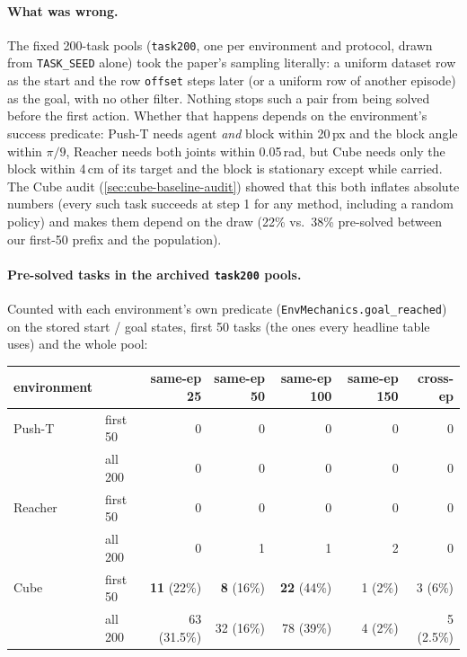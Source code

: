 \documentclass[11pt]{article}
\begin{document}
\paragraph{What was wrong.} The fixed 200-task pools (\texttt{task200}, one per environment
and protocol, drawn from \texttt{TASK\_SEED} alone) took the paper's sampling literally: a
uniform dataset row as the start and the row \texttt{offset} steps later (or a uniform row of
another episode) as the goal, with no other filter. Nothing stops such a pair from being
solved before the first action. Whether that happens depends on the environment's success
predicate: Push-T needs agent \emph{and} block within 20\,px and the block angle within
$\pi/9$, Reacher needs both joints within 0.05\,rad, but Cube needs only the block within 4\,cm
of its target and the block is stationary except while carried. The Cube audit
(\cref{sec:cube-baseline-audit}) showed that this both inflates absolute numbers (every such
task succeeds at step 1 for any method, including a random policy) and makes them depend on
the draw (22\% vs.\ 38\% pre-solved between our first-50 prefix and the population).

\paragraph{Pre-solved tasks in the archived \texttt{task200} pools.} Counted with each
environment's own predicate (\texttt{EnvMechanics.goal\_reached}) on the stored start / goal
states, first 50 tasks (the ones every headline table uses) and the whole pool:

\begin{center}\small
\begin{tabular}{llrrrrr}
\toprule
environment & & same-ep 25 & same-ep 50 & same-ep 100 & same-ep 150 & cross-ep \\
\midrule
Push-T  & first 50 & 0 & 0 & 0 & 0 & 0 \\
        & all 200  & 0 & 0 & 0 & 0 & 0 \\
Reacher & first 50 & 0 & 0 & 0 & 0 & 0 \\
        & all 200  & 0 & 1 & 1 & 2 & 0 \\
Cube    & first 50 & \textbf{11} (22\%) & \textbf{8} (16\%) & \textbf{22} (44\%) & 1 (2\%) & 3 (6\%) \\
        & all 200  & 63 (31.5\%) & 32 (16\%) & 78 (39\%) & 4 (2\%) & 5 (2.5\%) \\
\bottomrule
\end{tabular}
\end{center}
\end{document}
